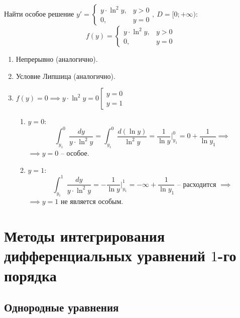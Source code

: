 \begin{example}
    Найти особое решение $y' = \left\{\begin{array}{rl}
            y\cdot\ln^2 y, & y > 0 \\
            0,             & y = 0
        \end{array}\right., \ D = [0;+\infty)$:
    \[
        f(y) = \left\{\begin{array}{rl}
            y\cdot\ln^2 y, & y > 0 \\
            0,             & y = 0
        \end{array}\right.
    \]
    \begin{enumerate}
        \item Непрерывно (аналогично).
        \item Условие Липшица (аналогично).
        \item $f(y) = 0 \implies y\cdot\ln^2y=0 \left[\begin{array}{l}
                      y = 0 \\
                      y = 1
                  \end{array}\right.$
              \begin{enumerate}
                  \item $y = 0$:
                        \[
                            \int_{y_1}^{0}\frac{dy}{y \cdot \ln^2 y} = \int_{y_1}^{0}\frac{d(\ln y)}{\ln^2 y} = \frac{1}{\ln y} \Big|_{y_1}^0 = 0 + \frac{1}{\ln y_1} \implies
                        \]
                        $\implies y =0$ -- особое.
                  \item $y = 1$:
                        \[
                            \int_{y_1}^{1}\frac{dy}{y\cdot \ln^2 y} = -\frac{1}{\ln y} \Big|_{y_1}^1 = -\infty + \frac{1}{\ln y_1}\text{ -- расходится } \implies
                        \]
                        $\implies y =1$ не является особым.
              \end{enumerate}
    \end{enumerate}
\end{example}

\chapter{Методы интегрирования дифференциальных уравнений $1$-го порядка}

\section{Однородные уравнения}

